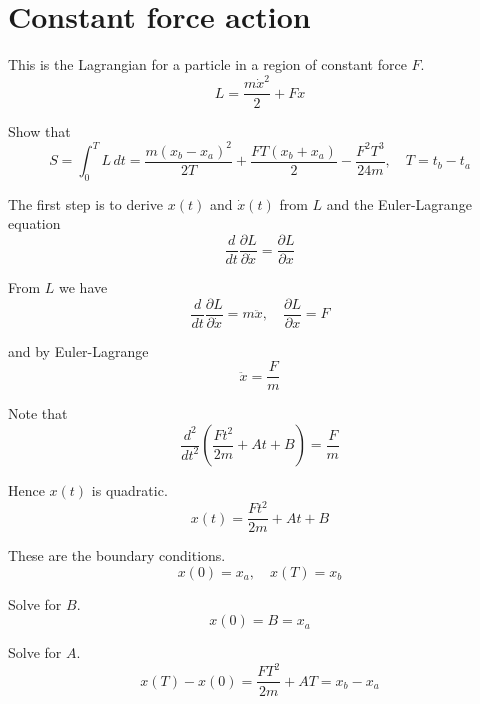 


\section*{Constant force action}

This is the Lagrangian for a particle in a region of constant force $F$.
\begin{equation*}
L=\frac{m\dot x^2}{2}+Fx
\end{equation*}

Show that
\begin{equation*}
S=\int_0^TL\,dt=\frac{m(x_b-x_a)^2}{2T}+\frac{FT(x_b+x_a)}{2}-\frac{F^2T^3}{24m},\quad T=t_b-t_a
\end{equation*}

The first step is to derive $x(t)$ and $\dot x(t)$ from $L$ and the Euler-Lagrange equation
\begin{equation*}
\frac{d}{dt}\frac{\partial L}{\partial\dot x}=\frac{\partial L}{\partial x}
\end{equation*}

From $L$ we have
\begin{equation*}
\frac{d}{dt}\frac{\partial L}{\partial\dot x}=m\ddot x,\quad
\frac{\partial L}{\partial x}=F
\end{equation*}

and by Euler-Lagrange
\begin{equation*}
\ddot x=\frac{F}{m}
\end{equation*}

Note that
\begin{equation*}
\frac{d^2}{dt^2}\left(\frac{Ft^2}{2m}+At+B\right)=\frac{F}{m}
\end{equation*}

Hence $x(t)$ is quadratic.
\begin{equation*}
x(t)=\frac{Ft^2}{2m}+At+B
\end{equation*}

These are the boundary conditions.
\begin{equation*}
x(0)=x_a,\quad x(T)=x_b
\end{equation*}

Solve for $B$.
\begin{equation*}
x(0)=B=x_a
\end{equation*}

Solve for $A$.
\begin{equation*}
x(T)-x(0)=\frac{FT^2}{2m}+AT=x_b-x_a
\end{equation*}

